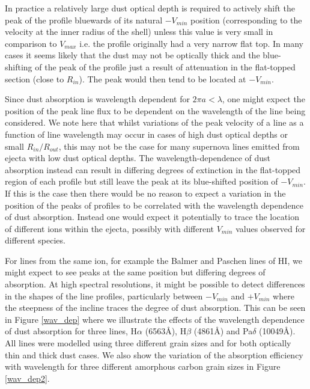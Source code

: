 \documentclass[useAMS,usenatbib,usegraphicx]{mnras}
\begin{document}
In practice a relatively  large dust optical depth is 
required to actively shift the peak of the profile bluewards of its natural 
$-V_{min}$ position (corresponding to the velocity at the inner radius of the shell) unless this value is very small in comparison to $V_{max}$ i.e. the profile originally had a very narrow flat top.  
In many cases it seems likely that the dust
may not be optically thick and the blue-shifting of the peak of the profile just
 a result of attenuation in the flat-topped section (close to 
$R_{in}$).  The peak would then tend to be located at $-V_{min}$.

Since dust absorption is wavelength dependent for $2\pi a < \lambda$, one might expect the 
position of the peak line flux to be dependent on the wavelength of the line being 
considered.  We note here that whilst variations of the peak velocity of a line as a function of line wavelength 
may occur in cases of high dust optical depths or small $R_{in}/R_{out}$, this may 
not be the case for many supernova lines emitted from ejecta with low dust optical depths.  
The wavelength-dependence of dust absorption instead 
can result in differing degrees of extinction in the flat-topped region of 
each profile but still leave the peak at its blue-shifted position of 
$-V_{min}$.  If this is the case then there would be no 
reason to expect a variation in the position of the peaks of profiles to be 
correlated with the wavelength dependence of dust absorption.  Instead one would 
expect it potentially to trace the location of different ions within the ejecta, possibly with different $V_{min}$ values observed for  
different species.  

For lines from the same ion, for example the Balmer and Paschen lines of HI,
we might expect to see peaks at the same position but differing degrees of absorption.
At high spectral resolutions, it might be possible to detect differences in the shapes of the line 
profiles, particularly between $-V_{min}$ and $+V_{min}$ where the steepness of the 
incline traces the degree of dust absorption.  This can be seen in Figure \ref{wav_dep} 
where we illustrate the effects of the wavelength dependence of dust absorption for 
three lines, H$\alpha$ (6563\AA), H$\beta$ (4861\AA) and Pa$\delta$ (10049\AA).  
All lines were modelled using three different grain sizes and for both optically thin and 
thick dust cases.  We also show the variation of the absorption efficiency with 
wavelength for three different amorphous carbon grain sizes in Figure \ref{wav_dep2}.
\end{document}
